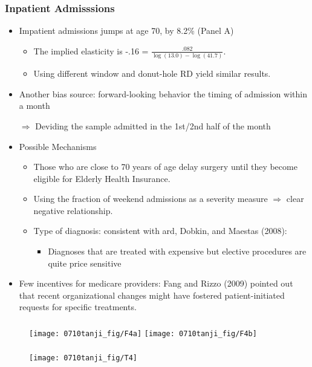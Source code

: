 \documentclass[dvipdfmx,11pt]{beamer}
\begin{document}
\begin{frame}\frametitle{Inpatient Admisssions}
  \begin{itemize}
    \item Impatient admissions jumps at age 70, by 8.2\% (Panel A)
    \begin{itemize}
      \item The implied elasticity is -.16 = $\frac{.082}{\log(13.0) - \log(41.7)}$.
      \item Using different window and donut-hole RD yield similar results.
    \end{itemize}
    \item Another bias source: forward-looking behavior the timing of admission within a month

    $\Rightarrow$ Deviding the sample admitted in the 1st/2nd half of the month
    \item Possible Mechanisms
    \begin{itemize}
      \item Those who are close to 70 years of age delay surgery until they become eligible for Elderly Health Insurance.
      \item Using the fraction of weekend admissions as a severity measure $\Rightarrow$ clear negative relationship.
      \item Type of diagnosis: consistent with ard, Dobkin, and Maestas (2008):
      \begin{itemize}
        \item Diagnoses that are treated with expensive but elective procedures are quite price sensitive
      \end{itemize}
    \end{itemize}
    \item Few incentives for medicare providers: Fang and Rizzo (2009) pointed out that recent organizational changes might have fostered patient-initiated requests for specific treatments.
  \end{itemize}
\end{frame}

\begin{frame}\frametitle{}
  \begin{figure}[ht]
    \centering
    \texttt{[image: 0710tanji\_fig/F4a]}
    \texttt{[image: 0710tanji\_fig/F4b]}
  \end{figure}
\end{frame}

\begin{frame}\frametitle{}
  \begin{figure}[ht]
    \centering
    \texttt{[image: 0710tanji\_fig/T4]}
  \end{figure}
\end{frame}
\end{document}
